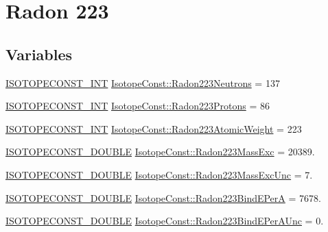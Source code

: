 \hypertarget{group___isotope_const-_radon-_rn223}{}\section{Radon 223}
\label{group___isotope_const-_radon-_rn223}
\subsection*{Variables}
\begin{DoxyCompactItemize}
\item 
\mbox{\hyperlink{group___isotope_const-_macros_ga5f18360b3e99483a35c32d789e62621c}{I\+S\+O\+T\+O\+P\+E\+C\+O\+N\+S\+T\+\_\+\+I\+NT}} \mbox{\hyperlink{group___isotope_const-_radon-_rn223_ga38024e8d25bcced1eea179b8723093af}{Isotope\+Const\+::\+Radon223\+Neutrons}} = 137
\item 
\mbox{\hyperlink{group___isotope_const-_macros_ga5f18360b3e99483a35c32d789e62621c}{I\+S\+O\+T\+O\+P\+E\+C\+O\+N\+S\+T\+\_\+\+I\+NT}} \mbox{\hyperlink{group___isotope_const-_radon-_rn223_ga7d65bdf4463aaf5c19f1cb7bdcf5196e}{Isotope\+Const\+::\+Radon223\+Protons}} = 86
\item 
\mbox{\hyperlink{group___isotope_const-_macros_ga5f18360b3e99483a35c32d789e62621c}{I\+S\+O\+T\+O\+P\+E\+C\+O\+N\+S\+T\+\_\+\+I\+NT}} \mbox{\hyperlink{group___isotope_const-_radon-_rn223_ga4e0028468deef1503e9a40a5436881ab}{Isotope\+Const\+::\+Radon223\+Atomic\+Weight}} = 223
\item 
\mbox{\hyperlink{group___isotope_const-_macros_ga8f45a7272ce02c0b4c65c44636ed719a}{I\+S\+O\+T\+O\+P\+E\+C\+O\+N\+S\+T\+\_\+\+D\+O\+U\+B\+LE}} \mbox{\hyperlink{group___isotope_const-_radon-_rn223_ga9ed08023a99093787cd580fce73f21cb}{Isotope\+Const\+::\+Radon223\+Mass\+Exc}} = 20389.
\item 
\mbox{\hyperlink{group___isotope_const-_macros_ga8f45a7272ce02c0b4c65c44636ed719a}{I\+S\+O\+T\+O\+P\+E\+C\+O\+N\+S\+T\+\_\+\+D\+O\+U\+B\+LE}} \mbox{\hyperlink{group___isotope_const-_radon-_rn223_gae968af2c8d4f4b62b752165944383317}{Isotope\+Const\+::\+Radon223\+Mass\+Exc\+Unc}} = 7.
\item 
\mbox{\hyperlink{group___isotope_const-_macros_ga8f45a7272ce02c0b4c65c44636ed719a}{I\+S\+O\+T\+O\+P\+E\+C\+O\+N\+S\+T\+\_\+\+D\+O\+U\+B\+LE}} \mbox{\hyperlink{group___isotope_const-_radon-_rn223_ga1a834d0f27ae8691fe94108ee8f82a1a}{Isotope\+Const\+::\+Radon223\+Bind\+E\+PerA}} = 7678.
\item 
\mbox{\hyperlink{group___isotope_const-_macros_ga8f45a7272ce02c0b4c65c44636ed719a}{I\+S\+O\+T\+O\+P\+E\+C\+O\+N\+S\+T\+\_\+\+D\+O\+U\+B\+LE}} \mbox{\hyperlink{group___isotope_const-_radon-_rn223_ga17094b936978f1cf33c08035fbeb61af}{Isotope\+Const\+::\+Radon223\+Bind\+E\+Per\+A\+Unc}} = 0.

\end{DoxyCompactItemize}
